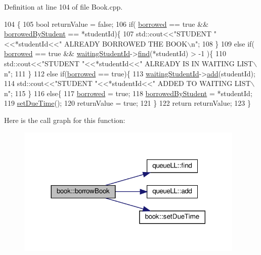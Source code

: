 Definition at line 104 of file Book.\+cpp.


\begin{DoxyCode}
104                                      \{
105     \textcolor{keywordtype}{bool} returnValue = \textcolor{keyword}{false};
106     \textcolor{keywordflow}{if}( \hyperlink{classbook_ab745520ed537e69bde6f2e3d7a103276}{borrowed} == \textcolor{keyword}{true} && \hyperlink{classbook_afa5350900be6a34d8301a57d6db54df5}{borrowedByStudent} == *studentId)\{
107         std::cout<<\textcolor{stringliteral}{"STUDENT "}<<*studentId<<\textcolor{stringliteral}{" ALREADY BORROWED THE BOOK\(\backslash\)n"};
108     \}
109     \textcolor{keywordflow}{else} \textcolor{keywordflow}{if}( \hyperlink{classbook_ab745520ed537e69bde6f2e3d7a103276}{borrowed} == \textcolor{keyword}{true} && \hyperlink{classbook_a40ce04fcfbf99ffdbe7a4e1463588ee5}{waitingStudentId}->\hyperlink{classqueue_l_l_af46d9d07b7528da834c2c37d752c29f5}{find}(*studentId) > -1  )\{
110             std::cout<<\textcolor{stringliteral}{"STUDENT "}<<*studentId<<\textcolor{stringliteral}{" ALREADY IS IN WAITING LIST\(\backslash\)n"};
111         \}
112     \textcolor{keywordflow}{else} \textcolor{keywordflow}{if}(\hyperlink{classbook_ab745520ed537e69bde6f2e3d7a103276}{borrowed} == \textcolor{keyword}{true})\{
113         \hyperlink{classbook_a40ce04fcfbf99ffdbe7a4e1463588ee5}{waitingStudentId}->\hyperlink{classqueue_l_l_adcbcc26433da2c9d17b6cf0802d1d7d2}{add}(studentId);
114         std::cout<<\textcolor{stringliteral}{"STUDENT "}<<*studentId<<\textcolor{stringliteral}{" ADDED TO WAITING LIST\(\backslash\)n"};
115     \}
116     \textcolor{keywordflow}{else}\{
117         \hyperlink{classbook_ab745520ed537e69bde6f2e3d7a103276}{borrowed} = \textcolor{keyword}{true};
118         \hyperlink{classbook_afa5350900be6a34d8301a57d6db54df5}{borrowedByStudent} = *studentId;
119         \hyperlink{classbook_a61624bab2476a61fb2f27ebf7c8976e3}{setDueTime}();
120         returnValue = \textcolor{keyword}{true};
121     \}
122     \textcolor{keywordflow}{return}  returnValue;
123 \}
\end{DoxyCode}
Here is the call graph for this function\+:
\nopagebreak
\begin{figure}[H]
\begin{center}
\leavevmode
\includegraphics[width=308pt]{classbook_a68bc47d79edd93594d50f720be2653f6_cgraph}
\end{center}
\end{figure}
